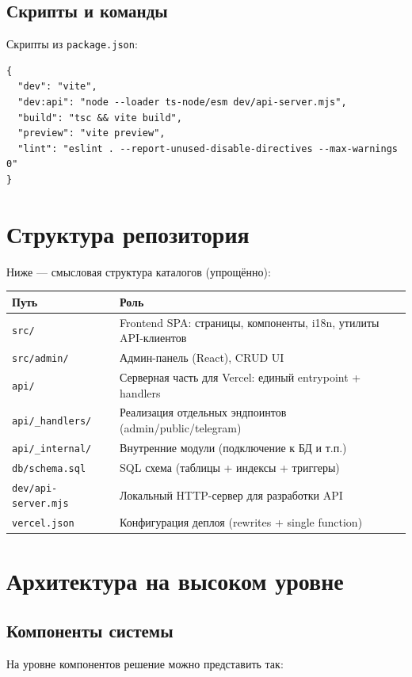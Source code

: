\documentclass[12pt,a4paper]{article}
\begin{document}
\subsection{Скрипты и команды}
Скрипты из \texttt{package.json}:
\begin{verbatim}
{
  "dev": "vite",
  "dev:api": "node --loader ts-node/esm dev/api-server.mjs",
  "build": "tsc && vite build",
  "preview": "vite preview",
  "lint": "eslint . --report-unused-disable-directives --max-warnings 0"
}
\end{verbatim}

\section{Структура репозитория}
Ниже --- смысловая структура каталогов (упрощённо):

\begin{longtable}{@{}p{}p{}@{}}
\toprule
\textbf{Путь} & \textbf{Роль} \\
\midrule
\texttt{src/} & Frontend SPA: страницы, компоненты, i18n, утилиты API-клиентов \\
\texttt{src/admin/} & Админ-панель (React), CRUD UI \\
\texttt{api/} & Серверная часть для Vercel: единый entrypoint + handlers \\
\texttt{api/_handlers/} & Реализация отдельных эндпоинтов (admin/public/telegram) \\
\texttt{api/_internal/} & Внутренние модули (подключение к БД и т.п.) \\
\texttt{db/schema.sql} & SQL схема (таблицы + индексы + триггеры) \\
\texttt{dev/api-server.mjs} & Локальный HTTP-сервер для разработки API \\
\texttt{vercel.json} & Конфигурация деплоя (rewrites + single function) \\
\bottomrule
\end{longtable}

\section{Архитектура на высоком уровне}
\subsection{Компоненты системы}
На уровне компонентов решение можно представить так:
\end{document}

